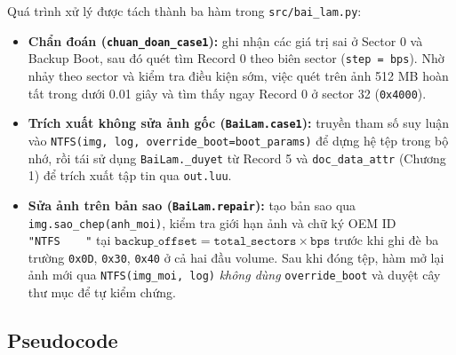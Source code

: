 Quá trình xử lý được tách thành ba hàm trong \texttt{src/bai\_lam.py}:
\begin{itemize}
    \item \textbf{Chẩn đoán (\texttt{chuan\_doan\_case1}):} ghi nhận các giá trị sai ở Sector 0 và Backup Boot, sau đó quét tìm Record 0 theo biên sector (\texttt{step = bps}). Nhờ nhảy theo sector và kiểm tra điều kiện sớm, việc quét trên ảnh 512 MB hoàn tất trong dưới 0.01 giây và tìm thấy ngay Record 0 ở sector 32 (\texttt{0x4000}).
    \item \textbf{Trích xuất không sửa ảnh gốc (\texttt{BaiLam.case1}):} truyền tham số suy luận vào \texttt{NTFS(img, log, override\_boot=boot\_params)} để dựng hệ tệp trong bộ nhớ, rồi tái sử dụng \texttt{BaiLam.\_duyet} từ Record 5 và \texttt{doc\_data\_attr} (Chương 1) để trích xuất tập tin qua \texttt{out.luu}.
    \item \textbf{Sửa ảnh trên bản sao (\texttt{BaiLam.repair}):} tạo bản sao qua \texttt{img.sao\_chep(anh\_moi)}, kiểm tra giới hạn ảnh và chữ ký OEM ID \texttt{"NTFS\ \ \ \ "} tại $\texttt{backup\_offset} = \texttt{total\_sectors} \times \texttt{bps}$ trước khi ghi đè ba trường \texttt{0x0D}, \texttt{0x30}, \texttt{0x40} ở cả hai đầu volume. Sau khi đóng tệp, hàm mở lại ảnh mới qua \texttt{NTFS(img\_moi, log)} \textit{không dùng} \texttt{override\_boot} và duyệt cây thư mục để tự kiểm chứng.
\end{itemize}

\subsection{Pseudocode}

